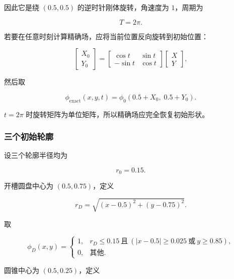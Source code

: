 \documentclass[UTF8,12pt,a4paper,fontset=fandol]{ctexart}
\numberwithin{equation}{section}
\begin{document}
因此它是绕 $(0.5,0.5)$ 的逆时针刚体旋转，角速度为 $1$，周期为

\begin{equation}
  T=2\pi.
\end{equation}

若要在任意时刻计算精确场，应将当前位置反向旋转到初始位置：

\begin{equation}
  \begin{bmatrix}X_0\\Y_0\end{bmatrix}
  =
  \begin{bmatrix}
  \cos t&\sin t\\
  -\sin t&\cos t
  \end{bmatrix}
  \begin{bmatrix}X\\Y\end{bmatrix},
\end{equation}

然后取

\begin{equation}
  \phi_{\mathrm{exact}}(x,y,t)
  =
  \phi_0(0.5+X_0,\;0.5+Y_0).
\end{equation}

$t=2\pi$ 时旋转矩阵为单位矩阵，所以精确场应完全恢复初始形状。

\subsubsection{三个初始轮廓}

设三个轮廓半径均为

\begin{equation}
  r_0=0.15.
\end{equation}

开槽圆盘中心为 $(0.5,0.75)$，定义

\begin{equation}
  r_D=\sqrt{(x-0.5)^2+(y-0.75)^2}.
\end{equation}

取

\begin{equation}
  \phi_D(x,y)=
  \begin{cases}
  1,
  &r_D\leq0.15
  \ \text{且}\
  \left(|x-0.5|\geq0.025\ \text{或}\ y\geq0.85\right),\\
  0,&\text{其他}.
  \end{cases}
\end{equation}

圆锥中心为 $(0.5,0.25)$，定义
\end{document}
